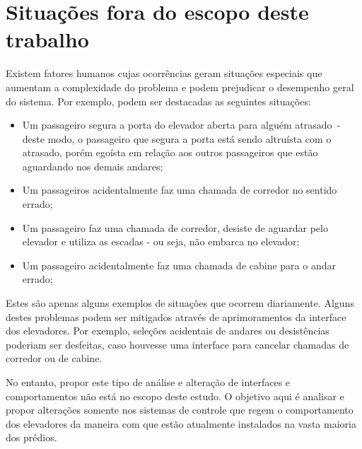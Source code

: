 \section{\label{section:difficulties}Situações fora do escopo deste trabalho}

Existem fatores humanos cujas ocorrências geram situações especiais que aumentam
a complexidade do problema e podem prejudicar o desempenho geral do sistema. Por
exemplo, podem ser destacadas as seguintes situações:

\begin{itemize}
  \item Um passageiro segura a porta do elevador aberta para alguém atrasado~-~
        deste modo, o passageiro que segura a porta está sendo altruísta com o
        atrasado, porém egoísta em relação aos outros passageiros que estão
        aguardando nos demais andares;
  \item Um passageiros acidentalmente faz uma chamada de corredor no sentido
        errado;
  \item Um passageiro faz uma chamada de corredor, desiste de aguardar pelo
        elevador e utiliza as escadas - ou seja, não embarca no elevador;
  \item Um passageiro acidentalmente faz uma chamada de cabine para o andar
        errado;
\end{itemize}

Estes são apenas alguns exemplos de situações que ocorrem diariamente. Alguns
destes problemas podem ser mitigados através de aprimoramentos da interface dos
elevadores. Por exemplo, seleções acidentais de andares ou desistências poderiam
ser desfeitas, caso houvesse uma interface para cancelar chamadas de corredor ou
de cabine.

No entanto, propor este tipo de análise e alteração de interfaces e
comportamentos não está no escopo deste estudo. O objetivo aqui é analisar e
propor alterações somente nos sistemas de controle que regem o comportamento dos
elevadores da maneira com que estão atualmente instalados na vasta maioria dos
prédios.